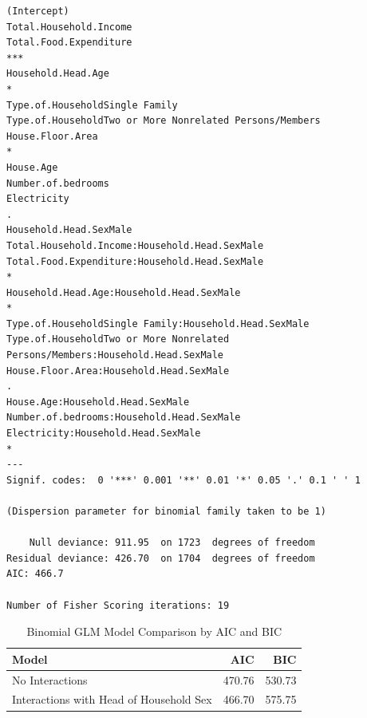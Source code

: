 \documentclass[
]{article}
\begin{document}
\begin{verbatim}
(Intercept)                                                                       
Total.Household.Income                                                            
Total.Food.Expenditure                                                         ***
Household.Head.Age                                                             *  
Type.of.HouseholdSingle Family                                                    
Type.of.HouseholdTwo or More Nonrelated Persons/Members                           
House.Floor.Area                                                               *  
House.Age                                                                         
Number.of.bedrooms                                                                
Electricity                                                                    .  
Household.Head.SexMale                                                            
Total.Household.Income:Household.Head.SexMale                                     
Total.Food.Expenditure:Household.Head.SexMale                                  *  
Household.Head.Age:Household.Head.SexMale                                      *  
Type.of.HouseholdSingle Family:Household.Head.SexMale                             
Type.of.HouseholdTwo or More Nonrelated Persons/Members:Household.Head.SexMale    
House.Floor.Area:Household.Head.SexMale                                        .  
House.Age:Household.Head.SexMale                                                  
Number.of.bedrooms:Household.Head.SexMale                                         
Electricity:Household.Head.SexMale                                             *  
---
Signif. codes:  0 '***' 0.001 '**' 0.01 '*' 0.05 '.' 0.1 ' ' 1

(Dispersion parameter for binomial family taken to be 1)

    Null deviance: 911.95  on 1723  degrees of freedom
Residual deviance: 426.70  on 1704  degrees of freedom
AIC: 466.7

Number of Fisher Scoring iterations: 19
\end{verbatim}

\begin{table}[H]

\caption{\label{tab:binomial glm model comparison}Binomial GLM Model Comparison by AIC and BIC}
\centering
\begin{tabular}[t]{lrr}
\toprule
Model & AIC & BIC\\
\midrule
No Interactions & 470.76 & 530.73\\
Interactions with Head of Household Sex & 466.70 & 575.75\\
\bottomrule
\end{tabular}
\end{table}
\end{document}
